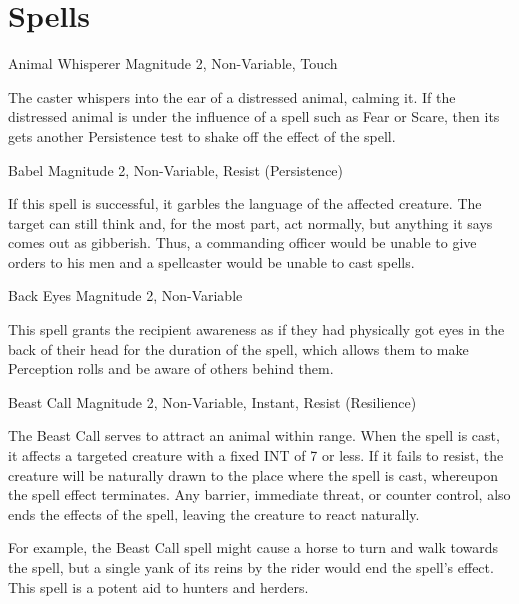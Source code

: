 \section{Spells}

\begin{rpg-spell}
{Animal Whisperer}
{Magnitude 2, Non-Variable, Touch}

The caster whispers into the ear of a distressed animal, calming it. If the distressed animal is under the influence of a spell such as Fear or Scare, then its gets another Persistence test to shake off the effect of the spell.
\end{rpg-spell}


%


\begin{rpg-spell}
{Babel}
{Magnitude 2, Non-Variable, Resist (Persistence)}

If this spell is successful, it garbles the language of the affected creature. The target can still think and, for the most part, act normally, but anything it says comes out as gibberish. Thus, a commanding officer would be unable to give orders to his men and a spellcaster would be unable to cast spells.
\end{rpg-spell}



\begin{rpg-spell}
{Back Eyes}
{Magnitude 2, Non-Variable}

This spell grants the recipient awareness as if they had physically got eyes in the back of their head for the duration of the spell, which allows them to make Perception rolls and be aware of others behind them.
\end{rpg-spell}



\begin{rpg-spell}
{Beast Call}
{Magnitude 2, Non-Variable, Instant, Resist (Resilience)}

The Beast Call serves to attract an animal within range. When the spell is cast, it affects a targeted creature with a fixed INT of 7 or less. If it fails to resist, the creature will be naturally drawn to the place where the spell is cast, whereupon the spell effect terminates. Any barrier, immediate threat, or counter control, also ends the effects of the spell, leaving the creature to react naturally. 

For example, the Beast Call spell might cause a horse to turn and walk towards the spell, but a single yank of its reins by the rider would end the spell’s effect. This spell is a potent aid to hunters and herders.
\end{rpg-spell}


